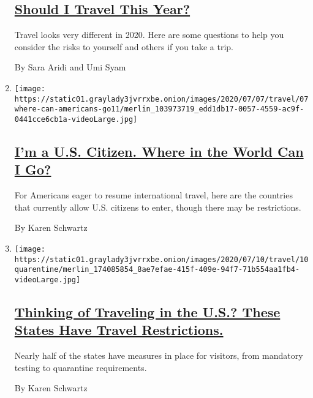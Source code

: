 \begin{enumerate}
  \hypertarget{should-i-travel-this-year}{%
  \subsection{\texorpdfstring{\href{/interactive/2020/07/31/travel/coronavirus-travel-risk.html}{Should
  I Travel This
  Year?}}{Should I Travel This Year?}}\label{should-i-travel-this-year}}

  Travel looks very different in 2020. Here are some questions to help
  you consider the risks to yourself and others if you take a trip.

  By Sara Aridi and Umi Syam
\item
  \texttt{[image: https://static01.graylady3jvrrxbe.onion/images/2020/07/07/travel/07where-can-americans-go11/merlin\_103973719\_edd1db17-0057-4559-ac9f-0441cce6cb1a-videoLarge.jpg]}

  \hypertarget{im-a-us-citizen-where-in-the-world-can-i-go}{%
  \subsection{\texorpdfstring{\href{/2020/07/07/travel/american-travelers-restrictions-coronavirus.html}{I'm
  a U.S. Citizen. Where in the World Can I
  Go?}}{I'm a U.S. Citizen. Where in the World Can I Go?}}\label{im-a-us-citizen-where-in-the-world-can-i-go}}

  For Americans eager to resume international travel, here are the
  countries that currently allow U.S. citizens to enter, though there
  may be restrictions.

  By Karen Schwartz
\item
  \texttt{[image: https://static01.graylady3jvrrxbe.onion/images/2020/07/10/travel/10quarentine/merlin\_174085854\_8ae7efae-415f-409e-94f7-71b554aa1fb4-videoLarge.jpg]}

  \hypertarget{thinking-of-traveling-in-the-us-these-states-have-travel-restrictions}{%
  \subsection{\texorpdfstring{\href{/2020/07/10/travel/state-travel-restrictions.html}{Thinking
  of Traveling in the U.S.? These States Have Travel
  Restrictions.}}{Thinking of Traveling in the U.S.? These States Have Travel Restrictions.}}\label{thinking-of-traveling-in-the-us-these-states-have-travel-restrictions}}

  Nearly half of the states have measures in place for visitors, from
  mandatory testing to quarantine requirements.

  By Karen Schwartz
\end{enumerate}

